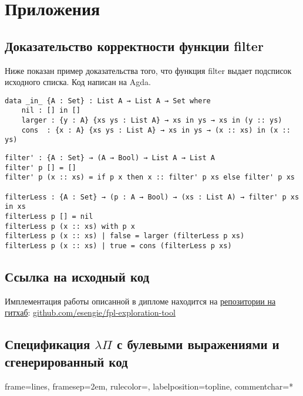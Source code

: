 \appendix
\section*{Приложения}
\renewcommand{\thesubsection}{\Alph{subsection}}

\subsection{Доказательство корректности функции filter}\label{sort_proof}

Ниже показан пример доказательства того, что функция filter выдает подсписок исходного списка.
Код написан на Agda\cite{agda}.


\begin{lstlisting}[caption={Определяем предикат означающий "список xs является подсписком ys"},captionpos=b, frame=single]
data _in_ {A : Set} : List A → List A → Set where
    nil : [] in []
    larger : {y : A} {xs ys : List A} → xs in ys → xs in (y :: ys)
    cons  : {x : A} {xs ys : List A} → xs in ys → (x :: xs) in (x :: ys)
\end{lstlisting}



\begin{lstlisting}[caption={Докажем, что filter xs подсписок xs для любого списка xs},captionpos=b, frame=single]
filter' : {A : Set} → (A → Bool) → List A → List A
filter' p [] = []
filter' p (x :: xs) = if p x then x :: filter' p xs else filter' p xs

filterLess : {A : Set} → (p : A → Bool) → (xs : List A) → filter' p xs in xs
filterLess p [] = nil
filterLess p (x :: xs) with p x
filterLess p (x :: xs) | false = larger (filterLess p xs)
filterLess p (x :: xs) | true = cons (filterLess p xs)
\end{lstlisting}


\subsection{Ссылка на исходный код}\label{source_code}
Имплементация работы описанной в дипломе находится на \href{https://github.com/esengie/fpl-exploration-tool}{репозитории на гитхаб}: \url{github.com/esengie/fpl-exploration-tool}

\pagebreak
\subsection{Спецификация $\lambda\Pi$ с булевыми выражениями и сгенерированный код}\label{lambdaPiSpec}

{}%
{
 frame=lines,  %
 framesep=2em, %
 rulecolor=\color{Gray},
 labelposition=topline,
 commentchar=*        %
}


